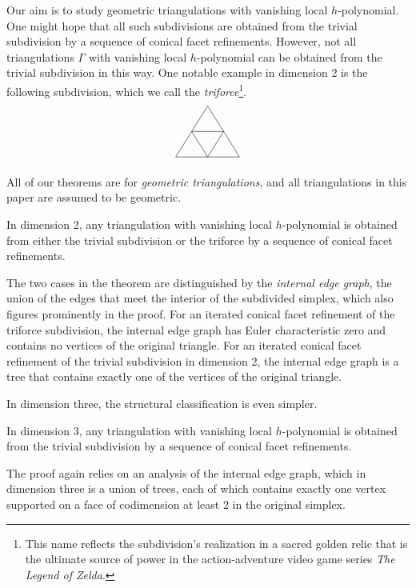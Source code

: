 \documentclass[ALCO,ThmDefs,Unicode,epreuves]{cedram}
\begin{document}
Our aim is to study geometric triangulations with vanishing local $h$-polynomial.
One might hope that all such subdivisions are obtained from the trivial subdivision by a 
sequence of conical facet refinements. 
However, not all triangulations $\Gamma$ with vanishing local $h$-polynomial can be obtained from 
the trivial subdivision in this way. One notable example
in dimension 2 is the following subdivision, which we call the 
\emph{triforce}\footnote{This name reflects the subdivision's realization in a sacred
golden relic that is the ultimate source of power in the action-adventure video game 
series \emph{The Legend of Zelda}.}.
\[
\begin{tikzpicture}[scale=2]
\draw (0.5,0.8) -- (1,0) -- (0,0) -- (0.5,0.8);
\draw (0.75,0.4) -- (0.5,0) -- (0.25,0.4) -- (0.75,0.4);
\end{tikzpicture}
\]

All of our theorems are for \emph{geometric triangulations}, and all triangulations in this paper are assumed to be geometric.

\begin{theorem} \label{thm:dim2}
In dimension 2, any triangulation with vanishing local $h$-polynomial is obtained from either the trivial subdivision or the triforce by a sequence of conical facet refinements.
\end{theorem}

\noindent The two cases in the theorem are distinguished by the \emph{internal edge graph}, \ie the union of the edges that meet the interior of the subdivided simplex, which also figures prominently in the proof. For an iterated conical facet refinement of the triforce subdivision, the internal edge graph has Euler characteristic zero and contains no vertices of the original triangle. For an iterated conical facet refinement of the trivial subdivision in dimension 2, the internal edge graph is a tree that contains exactly one of the vertices of the original triangle.

In dimension three, the structural classification is even simpler.

\begin{theorem} \label{thm:dim3}
In dimension 3, any triangulation with vanishing local $h$-polynomial is obtained from the trivial subdivision by a sequence of conical facet refinements.
\end{theorem}

\noindent The proof again relies on an analysis of the internal edge graph, which in dimension three is a union of trees, each of which contains exactly one vertex supported on a face of codimension at least 2 in the original simplex.
\end{document}

